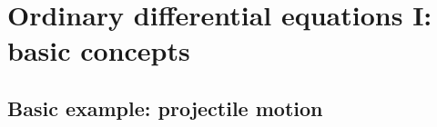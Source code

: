 \chapter{Ordinary differential equations I: basic concepts}
\label{sec:ode1}

\section{Basic example: projectile motion}